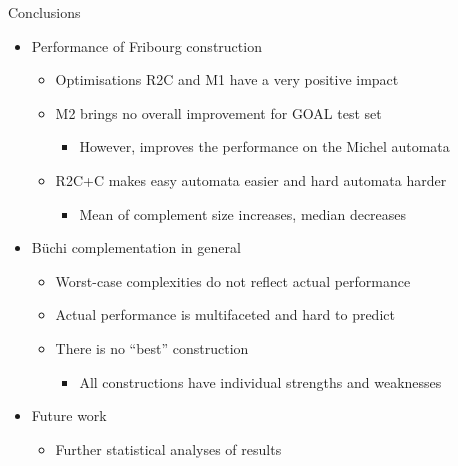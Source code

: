 \documentclass[12pt]{beamer}
\begin{document}
\begin{frame}{Conclusions}
\begin{itemize}\itemsep5pt
\item Performance of Fribourg construction
  \begin{itemize}\itemsep3pt\vspace{-0.5mm}
  \item Optimisations R2C and M1 have a very positive impact
  \item M2 brings no overall improvement for GOAL test set
    \begin{itemize}\vspace{-0.5mm}
    \item However, improves the performance on the Michel automata
    \end{itemize}
  \item R2C+C makes easy automata easier and hard automata harder
    \begin{itemize}\vspace{-0.5mm}
    \item Mean of complement size increases, median decreases
    \end{itemize}
  \end{itemize}
\pause
\item Büchi complementation in general
  \begin{itemize}\itemsep3pt\vspace{-0.5mm}
  \item Worst-case complexities do not reflect actual performance\vspace{-0.5mm}
  \item Actual performance is multifaceted and hard to predict
  \item There is no ``best'' construction
    \begin{itemize}\vspace{-0.5mm}
    \item All constructions have individual strengths and weaknesses
    \end{itemize}
  \end{itemize}
\pause
\item Future work
  \begin{itemize}\vspace{-0.5mm}
  \item Further statistical analyses of results
  \end{itemize}
\end{itemize}
\end{frame}
\end{document}
